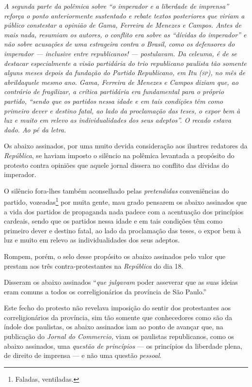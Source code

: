\begin{didascalia}
\emph{A segunda parte da polêmica sobre ``o imperador e a liberdade de
imprensa'' reforça o ponto anteriormente sustentado e rebate textos
posteriores que viriam a público constestar a opinião de Gama, Ferreira
de Menezes e Campos. Antes de mais nada, resumiam os autores, o conflito
era sobre as ``dívidas do imperador'' e não sobre acusações de uma
estrageira contra o Brasil, como os defensores do imperador --- inclusive
entre republicanos! --- postulavam. Da celeuma, é de se destacar
especialmente a visão partidária do trio republicano paulista tão
somente alguns meses depois da fundação do Partido Republicano, em Itu
(\textsc{sp}), no mês de abrildaquele mesmo ano. Gama, Ferreira de Menezes e
Campos diziam que, ao contrário de fragilizar, a crítica partidária era
fundamental para o próprio partido, ``sendo que os partidos nessa idade e
em tais condições têm como primeiro dever e destino fatal, ao lado da
proclamação das teses, o expor bem à luz e muito em relevo as
individualidades dos seus adeptos''. O recado estava dado. Ao pé da
letra.}
\end{didascalia}

Os abaixo assinados, por uma muito devida consideração aos ilustres
redatores da \emph{República}, se haviam imposto o silêncio na polêmica
levantada a propósito do protesto contra opiniões que aquele jornal
dissera no conflito das dívidas do imperador.

O silêncio fora-lhes também aconselhado pelas \emph{pretendidas}
conveniências do partido, vozeadas\footnote{ Faladas, ventiladas.} por
muita gente, mau grado pensarem os abaixo assinados que a vida dos
partidos de propaganda nada padece com a acentuação dos princípios
cardeais, sendo que os partidos nessa idade e em tais condições têm como
primeiro dever e destino fatal, ao lado da proclamação das teses, o
expor bem à luz e muito em relevo as individualidades dos seus adeptos.

Rompem, porém, o selo desse propósito os abaixo assinados pelo valor que
prestam aos três contra-protestantes na \emph{República} do dia 18.

Disseram os abaixo assinados ``\emph{que julgavam} poder asseverar que as
suas ideias eram comuns a todos os correligionários da província de São
Paulo.''

Este fecho do protesto não revelava imposição do sentir dos protestantes
aos correligionários da província, sim tão somente que conhecedores como
são da índole dos paulistas, os abaixo assinados iam ao ponto de avançar
que, na publicação do \emph{Jornal do Commercio,} viam os paulistas
republicanos, como os abaixo assinados, uma \emph{questão de princípios}
--- os princípios da liberdade plena, de direito de imprensa --- e não uma
questão \emph{pessoal}.


